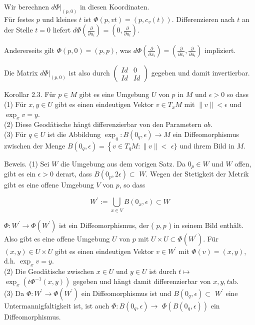 \documentclass[10pt, letterpaper]{article}
\begin{document}
Wir berechnen $\left.d \Phi\right|_{(p, 0)}$ in diesen Koordinaten.\\
Für festes $p$ und kleines $t$ ist $\Phi(p, v t)=\left(p, c_{v}(t)\right)$. Differenzieren nach $t$ an der Stelle $t=0$ liefert $d \Phi\left(\frac{\partial}{\partial u_{i}}\right)=\left(0, \frac{\partial}{\partial u_{i}}\right)$.

Andererseits gilt $\Phi(p, 0)=(p, p)$, was $d \Phi\left(\frac{\partial}{\partial x_{i}}\right)=\left(\frac{\partial}{\partial x_{i}}, \frac{\partial}{\partial u_{i}}\right)$ impliziert.

Die Matrix $\left.d \Phi\right|_{(p, 0)}$ ist also durch $\left(\begin{array}{cc}I d & 0 \\ I d & I d\end{array}\right)$ gegeben und damit invertierbar.

Korollar 2.3. Für $p \in M$ gibt es eine Umgebung $U$ von $p$ in $M$ und $\epsilon>0$ so dass\\
(1) Für $x, y \in U$ gibt es einen eindeutigen Vektor $v \in T_{x} M$ mit $\|v\|<\epsilon$ und $\exp _{x} v=y$.\\
(2) Diese Geodätische hängt differenzierbar von den Parametern $a b$.\\
(3) Für $q \in U$ ist die Abbildung $\exp _{q}: B\left(0_{q}, \epsilon\right) \rightarrow M$ ein Diffeomorphismus zwischen der Menge $B\left(0_{q}, \epsilon\right)=\left\{v \in T_{q} M:\|v\|<\right.$ $\epsilon\}$ und ihrem Bild in $M$.

Beweis. (1) Sei $W$ die Umgebung aus dem vorigen Satz. Da $0_{p} \in W$ und $W$ offen, gibt es ein $\epsilon>0$ derart, dass $B\left(0_{p}, 2 \epsilon\right) \subset$ $W$. Wegen der Stetigkeit der Metrik gibt es eine offene Umgebung $V$ von $p$, so dass

$$
W^{\prime}:=\bigcup_{x \in V} B\left(0_{x}, \epsilon\right) \subset W
$$

$\Phi: W^{\prime} \rightarrow \Phi\left(W^{\prime}\right)$ ist ein Diffeomorphismus, der ( $p, p$ ) in seinem Bild enthält. Also gibt es eine offene Umgebung $U$ von $p$ mit $U \times U \subset \Phi\left(W^{\prime}\right)$. Für $(x, y) \in U \times U$ gibt es einen eindeutigen Vektor $v \in W^{\prime}$ mit $\Phi(v)=(x, y)$, d.h. $\exp _{x} v=y$.\\
(2) Die Geodätische zwischen $x \in U$ und $y \in U$ ist durch $t \mapsto$ $\exp _{x}\left(t \Phi^{-1}(x, y)\right)$ gegeben und hängt damit differenzierbar von $x, y, t \mathrm{ab}$.\\
(3) Da $\Phi: W^{\prime} \rightarrow \Phi\left(W^{\prime}\right)$ ein Diffeomorphismus ist und $B\left(0_{q}, \epsilon\right) \subset$ $W^{\prime}$ eine Untermannigfaltigkeit ist, ist auch $\Phi: B\left(0_{q}, \epsilon\right) \rightarrow$ $\Phi\left(B\left(0_{q}, \epsilon\right)\right)$ ein Diffeomorphismus.
\end{document}
